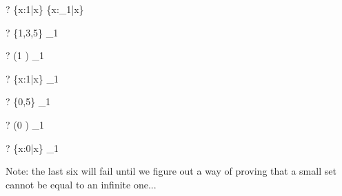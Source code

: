 \documentclass{article}
\begin{document}
\begin{zed} \vdash?  \{x:1|x\} \subset \{x:\nat_1|x\} \end{zed}
\begin{zed} \vdash?  \{1,3,5\} \subset \nat_1 \end{zed}
\begin{zed} \vdash?  (1 ) \subset \nat_1 \end{zed}
\begin{zed} \vdash?  \{x:1|x\} \subset \nat_1 \end{zed}
\begin{zed} \vdash?  \lnot \{0,5\} \subset \nat_1 \end{zed}
\begin{zed} \vdash?  \lnot (0 ) \subset \nat_1 \end{zed}
\begin{zed} \vdash?  \lnot \{x:0|x\} \subset \nat_1 \end{zed}
Note: the last six will fail until we figure out a way of proving
that a small set cannot be equal to an infinite one...
\end{document}

